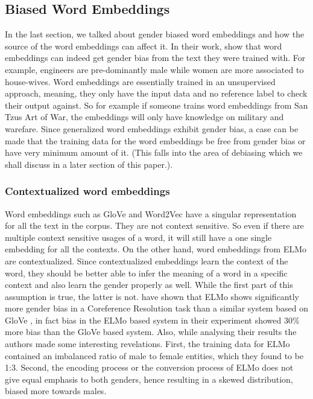 \documentclass{article}
\begin{document}
\subsection*{Biased Word Embeddings}
In the last section, we talked about gender biased word embeddings and how the source of the word embeddings can affect it. In their work, \cite{bolukbasi2016man} show that word embeddings can indeed get gender bias from the text they were trained with. For example, engineers are pre-dominantly male while women are more associated to house-wives. Word embeddings are essentially trained in an unsupervised approach, meaning, they only have the input data and no reference label to check their output against. So for example if someone trains word embeddings from San Tzus Art of War, the embeddings will only have knowledge on military and warefare. Since generalized word embeddings exhibit gender bias, a case can be made that the training data for the word embeddings be free from gender bias or have very minimum amount of it. (This falls into the area of debiasing which we shall discuss in a later section of this paper.). 

\subsubsection*{Contextualized word embeddings}
Word embeddings such as GloVe \cite{pennington2014glove} and Word2Vec have a singular representation for all the text in the corpus. They are not context sensitive. So even if there are multiple context sensitive usages of a word, it will still have a one single embedding for all the contexts. On the other hand, word embeddings from ELMo \cite{peters2018deep} are contextualized. Since contextualized embeddings learn the context of the word, they should be better able to infer the meaning of a word in a specific context and also learn the gender properly as well. While the first part of this assumption is true, the latter is not. \cite{zhao2019gender} have shown that ELMo shows significantly more gender bias in a Coreference Resolution task than a similar system based on GloVe \cite{lee2018higher}, in fact bias in the ELMo based system in their experiment showed 30\% more bias than the GloVe based system. Also, while analysing their results the authors made some interesting revelations. First, the training data for ELMo contained an imbalanced ratio of male to female entities, which they found to be 1:3. Second, the encoding process or the conversion process of ELMo does not give equal emphasis to both genders, hence resulting in a skewed distribution, biased more towards males.  \\
\end{document}
